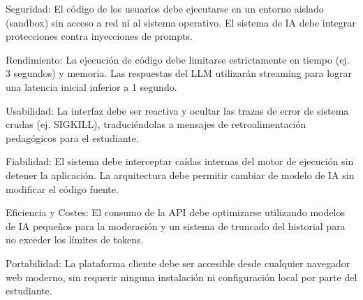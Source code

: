 \begin{nonfunctional}
    \item[RNF-01.-] Seguridad: El código de los usuarios debe ejecutarse en un entorno aislado (sandbox) sin acceso a red ni al sistema operativo. El sistema de IA debe integrar protecciones contra inyecciones de prompts.
    
    \item[RNF-02.-] Rendimiento: La ejecución de código debe limitarse estrictamente en tiempo (ej. 3 segundos) y memoria. Las respuestas del LLM utilizarán streaming para lograr una latencia inicial inferior a 1 segundo.
    
    \item[RNF-03.-] Usabilidad: La interfaz debe ser reactiva y ocultar las trazas de error de sistema crudas (ej. SIGKILL), traduciéndolas a mensajes de retroalimentación pedagógicos para el estudiante.
    
    \item[RNF-04.-] Fiabilidad: El sistema debe interceptar caídas internas del motor de ejecución sin detener la aplicación. La arquitectura debe permitir cambiar de modelo de IA sin modificar el código fuente.
    
    \item[RNF-05.-] Eficiencia y Costes: El consumo de la API debe optimizarse utilizando modelos de IA pequeños para la moderación y un sistema de truncado del historial para no exceder los límites de tokens.
    
    \item[RNF-06.-] Portabilidad: La plataforma cliente debe ser accesible desde cualquier navegador web moderno, sin requerir ninguna instalación ni configuración local por parte del estudiante.
\end{nonfunctional}
